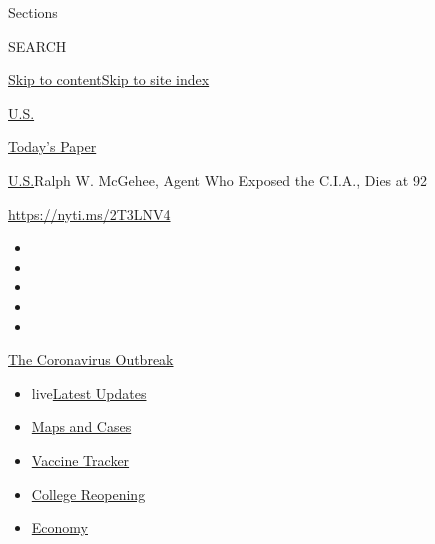 Sections

SEARCH

\protect\hyperlink{site-content}{Skip to
content}\protect\hyperlink{site-index}{Skip to site index}

\href{https://www.nytimes3xbfgragh.onion/section/us}{U.S.}

\href{https://myaccount.nytimes3xbfgragh.onion/auth/login?response_type=cookie\&client_id=vi}{}

\href{https://www.nytimes3xbfgragh.onion/section/todayspaper}{Today's
Paper}

\href{/section/us}{U.S.}\textbar{}Ralph W. McGehee, Agent Who Exposed
the C.I.A., Dies at 92

\url{https://nyti.ms/2T3LNV4}

\begin{itemize}
\item
\item
\item
\item
\item
\end{itemize}

\href{https://www.nytimes3xbfgragh.onion/news-event/coronavirus?action=click\&pgtype=Article\&state=default\&region=TOP_BANNER\&context=storylines_menu}{The
Coronavirus Outbreak}

\begin{itemize}
\tightlist
\item
  live\href{https://www.nytimes3xbfgragh.onion/2020/08/04/world/coronavirus-covid-19.html?action=click\&pgtype=Article\&state=default\&region=TOP_BANNER\&context=storylines_menu}{Latest
  Updates}
\item
  \href{https://www.nytimes3xbfgragh.onion/interactive/2020/us/coronavirus-us-cases.html?action=click\&pgtype=Article\&state=default\&region=TOP_BANNER\&context=storylines_menu}{Maps
  and Cases}
\item
  \href{https://www.nytimes3xbfgragh.onion/interactive/2020/science/coronavirus-vaccine-tracker.html?action=click\&pgtype=Article\&state=default\&region=TOP_BANNER\&context=storylines_menu}{Vaccine
  Tracker}
\item
  \href{https://www.nytimes3xbfgragh.onion/2020/08/02/us/covid-college-reopening.html?action=click\&pgtype=Article\&state=default\&region=TOP_BANNER\&context=storylines_menu}{College
  Reopening}
\item
  \href{https://www.nytimes3xbfgragh.onion/live/2020/08/03/business/stock-market-today-coronavirus?action=click\&pgtype=Article\&state=default\&region=TOP_BANNER\&context=storylines_menu}{Economy}
\end{itemize}

